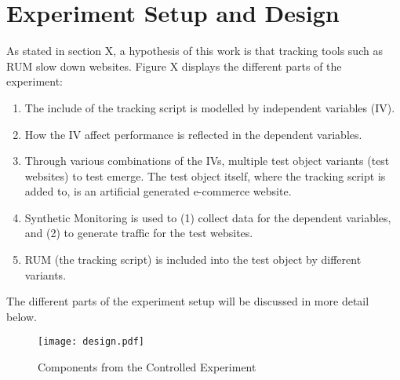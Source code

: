 





\section{Experiment Setup and Design}


As stated in section X, a hypothesis of this work is that tracking tools such as RUM slow down websites.
Figure X displays the different parts of the experiment:

\begin{enumerate}[label=(\alph*)]
\item The include of the tracking script is modelled by independent variables (IV).
\item How the IV affect performance is reflected in the dependent variables.
\item Through various combinations of the IVs, multiple test object variants (test websites) to test emerge. The test object itself, where the tracking script is added to, is an artificial generated e-commerce website.
\item Synthetic Monitoring is used to (1) collect data for the dependent variables, and (2) to generate traffic for the test websites.
\item RUM (the tracking script) is included into the test object by different variants. 
\end{enumerate}

The different parts of the experiment setup will be discussed in more detail below.

\begin{figure}[h!]
\begin{center}
\texttt{[image: design.pdf]}
\caption{Components from the Controlled Experiment}
\label{figure:design_setup}
\end{center}
\end{figure}




